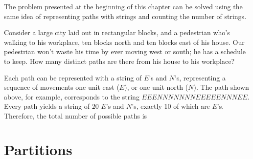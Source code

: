 \par
The problem presented at the beginning of this chapter can be solved using the same idea of representing paths with strings and counting the number of strings.

\begin{examp}Consider a large city laid out in rectangular blocks, and a pedestrian who's walking to his workplace, ten blocks north and ten blocks east of his house. Our pedestrian won't waste his time by ever moving west or south; he has a schedule to keep. How many distinct paths are there from his house to his workplace?

\begin{center}
\end{center}

\par
\noindent Each path can be represented with a string of $E$'s and $N$'s, representing a sequence of movements one unit east ($E$), or one unit north ($N$). The path shown above, for example, corresponds to the string $EEENNNNNNNEEEEENNNEE$. Every path yields a string of $20$ $E$'s and $N$'s, exactly 10 of which are $E$'s. Therefore, the total number of possible paths is

\end{examp}

\section{Partitions}

